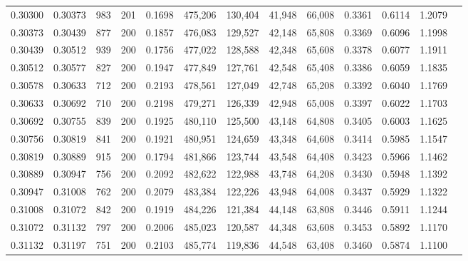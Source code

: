 \begin{tabular}{rrrrrrrrrrrrr}
0.30300 & 0.30373 &    983 & 201 &                                     0.1698 & 475,206 & 130,404 &  41,948 &  66,008 & 0.3361 & 0.6114 & 1.2079 \\
0.30373 & 0.30439 &    877 & 200 &                                     0.1857 & 476,083 & 129,527 &  42,148 &  65,808 & 0.3369 & 0.6096 & 1.1998 \\
0.30439 & 0.30512 &    939 & 200 &                                     0.1756 & 477,022 & 128,588 &  42,348 &  65,608 & 0.3378 & 0.6077 & 1.1911 \\
0.30512 & 0.30577 &    827 & 200 &                                     0.1947 & 477,849 & 127,761 &  42,548 &  65,408 & 0.3386 & 0.6059 & 1.1835 \\
0.30578 & 0.30633 &    712 & 200 &                                     0.2193 & 478,561 & 127,049 &  42,748 &  65,208 & 0.3392 & 0.6040 & 1.1769 \\
0.30633 & 0.30692 &    710 & 200 &                                     0.2198 & 479,271 & 126,339 &  42,948 &  65,008 & 0.3397 & 0.6022 & 1.1703 \\
0.30692 & 0.30755 &    839 & 200 &                                     0.1925 & 480,110 & 125,500 &  43,148 &  64,808 & 0.3405 & 0.6003 & 1.1625 \\
0.30756 & 0.30819 &    841 & 200 &                                     0.1921 & 480,951 & 124,659 &  43,348 &  64,608 & 0.3414 & 0.5985 & 1.1547 \\
0.30819 & 0.30889 &    915 & 200 &                                     0.1794 & 481,866 & 123,744 &  43,548 &  64,408 & 0.3423 & 0.5966 & 1.1462 \\
0.30889 & 0.30947 &    756 & 200 &                                     0.2092 & 482,622 & 122,988 &  43,748 &  64,208 & 0.3430 & 0.5948 & 1.1392 \\
0.30947 & 0.31008 &    762 & 200 &                                     0.2079 & 483,384 & 122,226 &  43,948 &  64,008 & 0.3437 & 0.5929 & 1.1322 \\
0.31008 & 0.31072 &    842 & 200 &                                     0.1919 & 484,226 & 121,384 &  44,148 &  63,808 & 0.3446 & 0.5911 & 1.1244 \\
0.31072 & 0.31132 &    797 & 200 &                                     0.2006 & 485,023 & 120,587 &  44,348 &  63,608 & 0.3453 & 0.5892 & 1.1170 \\
0.31132 & 0.31197 &    751 & 200 &                                     0.2103 & 485,774 & 119,836 &  44,548 &  63,408 & 0.3460 & 0.5874 & 1.1100 \\

\end{tabular}
